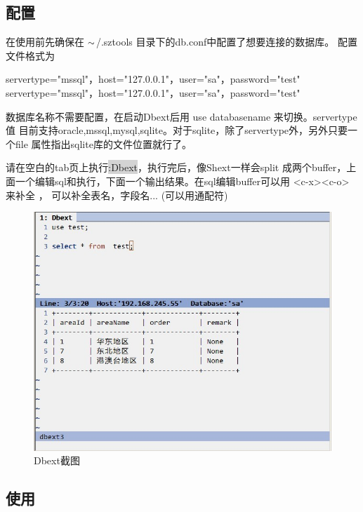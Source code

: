\documentclass[oneside,openany]{book}
\begin{document}
\subsection{配置}
   在使用前先确保在 $\tiny{\sim}$/.sztools 目录下的db.conf中配置了想要连接的数据库。
   配置文件格式为
    \begin{mdframed}[style=SmallFrame]
    \begin{flushleft}
    servertype="mssql"，host="127.0.0.1"，user="sa"，password="test"\newline
    servertype="mssql"，host="127.0.0.1"，user="sa"，password="test"
    \end{flushleft}
    \end{mdframed}
    数据库名称不需要配置，在启动Dbext后用 use databasename 来切换。servertype值
目前支持oracle,mssql,mysql,sqlite。对于sqlite，除了servertype外，另外只要一个file
属性指出sqlite库的文件位置就行了。

    请在空白的tab页上执行\colorbox{lightgray}{:Dbext}，执行完后，像Shext一样会split
成两个buffer，上面一个编辑sql和执行，下面一个输出结果。在sql编辑buffer可以用 
<c-x><c-o> 来补全 ， 可以补全表名，字段名... (可以用通配符) 

  \begin{figure}[htbp]%
  \centering
  \includegraphics[scale=0.5]{dbext.jpg}
  \caption{Dbext截图}
  \end{figure}

\subsection{使用}
\end{document}
